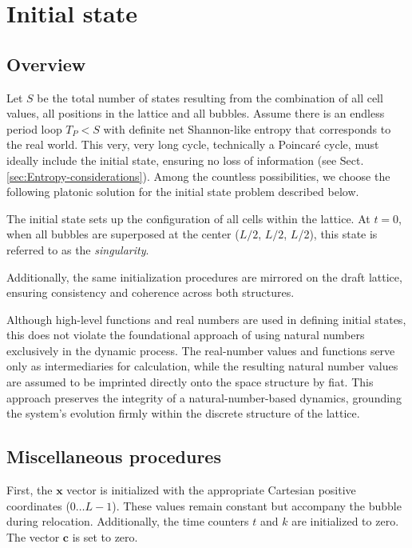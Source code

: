 \documentclass[12pt,english]{article}
\begin{document}

\section{Initial state}\label{initial-state}

\subsection{Overview}
Let $S$ be the total number of states resulting from the combination of all cell values, all positions in the lattice and all bubbles. Assume there is an endless period loop $T_{P}<S$ with definite net Shannon-like entropy \cite{shannon} that corresponds to the real world. This very, very long cycle, technically a Poincaré cycle, must ideally include the initial state, ensuring no loss of information (see Sect. \ref{sec:Entropy-considerations}). Among the countless possibilities, we choose the following platonic solution for the initial state problem described below.

The initial state sets up the configuration of all cells within the lattice. At $t=0$, when all bubbles are superposed at the center ($L/2$, $L/2$, $L$/2), this state is referred to as the \textit{singularity}.

Additionally, the same initialization procedures are mirrored on the draft lattice, ensuring consistency and coherence across both structures.

Although high-level functions and real numbers are used in defining initial states, this does not violate the foundational approach of using natural numbers exclusively in the dynamic process. The real-number values and functions serve only as intermediaries for calculation, while the resulting natural number values are assumed to be imprinted directly onto the space structure by fiat. This approach preserves the integrity of a natural-number-based dynamics, grounding the system’s evolution firmly within the discrete structure of the lattice.

\subsection{Miscellaneous procedures}
First, the $\boldsymbol{x}$ vector is initialized with the appropriate Cartesian positive coordinates ($0 \dots L-1$). These values remain constant but accompany the bubble during relocation. Additionally, the time counters $t$ and $k$ are initialized to zero. The vector $\mathbf{c}$ is set to zero. 
\end{document}
